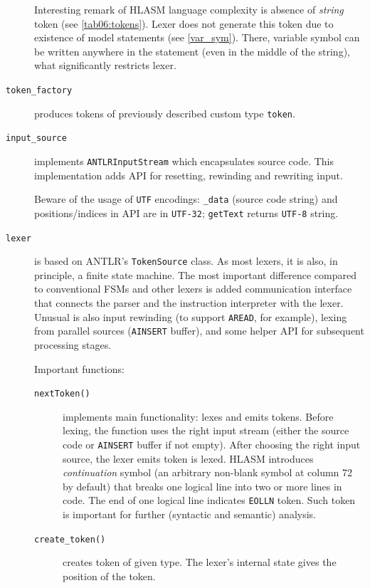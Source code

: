 \begin{description}
	Interesting remark of HLASM language complexity is absence of \emph{string} token (see \cref{tab06:tokens}). Lexer does not generate this token due to existence of model statements (see \cref{var_sym}). There, variable symbol can be written anywhere in the statement (even in the middle of the string), what significantly restricts lexer.
	
	\item[\texttt{token\_factory}] produces tokens of previously described custom type \texttt{token}.
	
	\item[\texttt{input\_source}] implements \texttt{ANTLRInputStream} which encapsulates source code. This implementation adds API for resetting, rewinding and rewriting input. 
	
	Beware of the usage of \texttt{UTF} encodings: \texttt{\_data} (source code string) and positions/indices in API are in \texttt{UTF-32}; \texttt{getText} returns \texttt{UTF-8} string.
	
	\item[\texttt{lexer}] is based on ANTLR's \texttt{TokenSource} class. As most lexers, it is also, in principle, a finite state machine. The most important difference compared to conventional FSMs and other lexers is added communication interface that connects the parser and the instruction interpreter with the lexer. Unusual is also input rewinding (to support \texttt{AREAD}, for example), lexing from parallel sources (\texttt{AINSERT} buffer), and some helper API for subsequent processing stages.
	
	Important functions:
	
	\begin{description}
		\item[\texttt{nextToken()}] implements main functionality: lexes and emits tokens. Before lexing, the function uses the right input stream (either the source code or \texttt{AINSERT} buffer if not empty). After choosing the right input source, the lexer emits token is lexed. HLASM introduces \textit{continuation} symbol (an arbitrary non-blank symbol at column 72 by default) that breaks one logical line into two or more lines in code. The end of one logical line indicates \texttt{EOLLN} token. Such token is important for further (syntactic and semantic) analysis.
		
		
		\item[\texttt{create\_token()}] creates token of given type. The lexer's internal state gives the position of the token. 
		

\end{description}
\end{description}

